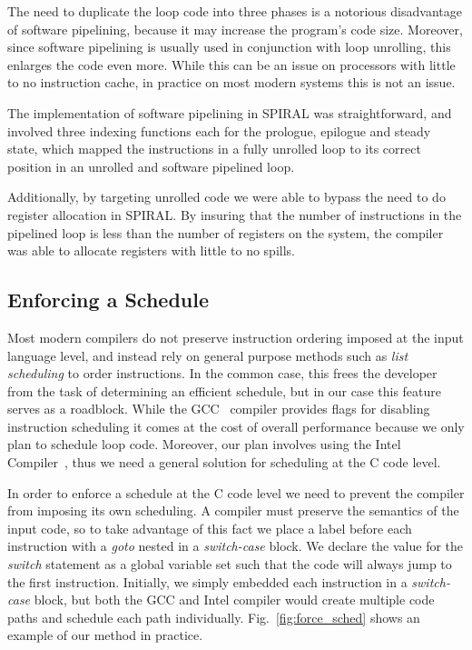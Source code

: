 \documentclass[10pt]{article}
\begin{document}
The need to duplicate the loop code into three phases is a notorious disadvantage of software
pipelining, because it may increase the program's code size. Moreover, since software pipelining
is usually used in conjunction with loop unrolling, this enlarges the code
even more. While this can be an issue on processors with little to no
instruction cache, in practice on most modern systems this is not an issue.

The implementation of software pipelining in SPIRAL was straightforward, and
involved three indexing functions each for the prologue, epilogue and steady
state, which mapped the instructions in a fully unrolled loop to its correct
position in an unrolled and software pipelined loop.

Additionally, by targeting unrolled code we were able to bypass the need to do
register allocation in SPIRAL. By insuring that the number of instructions in the
pipelined loop is less than the number of registers on the system, the
compiler was able to allocate registers with little to no spills.


\subsection{Enforcing a Schedule}

Most modern compilers do not preserve instruction ordering imposed at the
input language level, and instead rely on general purpose methods such
as \emph{list scheduling} to order instructions. In the common case, this frees
the developer from the task of determining an efficient schedule, but in our
case this feature serves as a roadblock. While the GCC~\cite{gccwebsite} compiler provides flags for
disabling instruction scheduling it comes at the cost of overall
performance because we only plan to schedule loop code. Moreover, our plan
involves using the Intel Compiler~\cite{iccwebsite}, thus we need a general solution for
scheduling at the C code level.

In order to enforce a schedule at the C code level we need to prevent the
compiler from imposing its own scheduling. A compiler must preserve the
semantics of the input code, so to take advantage of this fact we place a
label before each instruction with a \emph{goto} nested in
a \emph{switch-case} block. We declare the value for the \emph{switch}
statement as a global variable set such that the code will always jump to the
first instruction. Initially, we simply embedded each instruction in
a \emph{switch-case} block, but both the GCC and Intel compiler would create
multiple code paths and schedule each path individually. Fig.~\ref{fig:force_sched} shows
an example of our method in practice.
\end{document}
